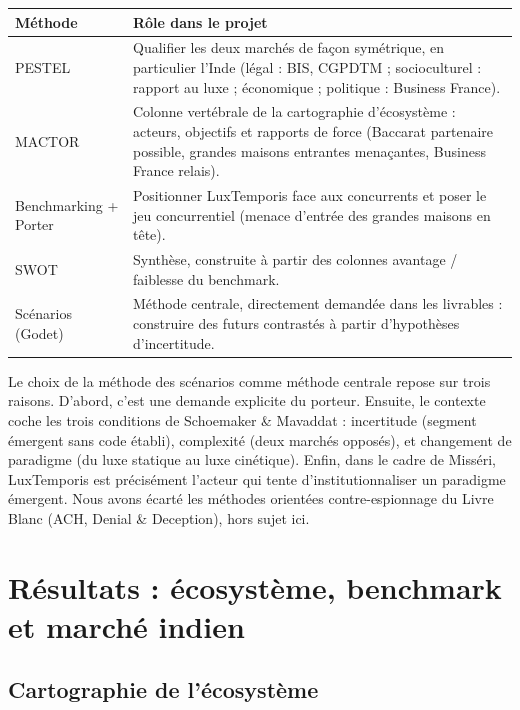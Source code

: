 \documentclass[11pt,a4paper]{article}
\begin{document}
\begin{center}
\begin{tabularx}{\linewidth}{L{3.4cm} X}
\toprule
\textbf{Méthode} & \textbf{Rôle dans le projet} \\
\midrule
PESTEL & Qualifier les deux marchés de façon symétrique, en particulier l'Inde (légal : BIS, CGPDTM ; socioculturel : rapport au luxe ; économique ; politique : Business France). \\
\addlinespace
MACTOR & Colonne vertébrale de la cartographie d'écosystème : acteurs, objectifs et rapports de force (Baccarat partenaire possible, grandes maisons entrantes menaçantes, Business France relais). \\
\addlinespace
Benchmarking + Porter & Positionner LuxTemporis face aux concurrents et poser le jeu concurrentiel (menace d'entrée des grandes maisons en tête). \\
\addlinespace
SWOT & Synthèse, construite à partir des colonnes avantage / faiblesse du benchmark. \\
\addlinespace
Scénarios (Godet) & Méthode centrale, directement demandée dans les livrables : construire des futurs contrastés à partir d'hypothèses d'incertitude. \\

\bottomrule
\end{tabularx}
\end{center}

Le choix de la méthode des scénarios comme méthode centrale repose sur trois raisons. D'abord, c'est une demande explicite du porteur. Ensuite, le contexte coche les trois conditions de Schoemaker \& Mavaddat : incertitude (segment émergent sans code établi), complexité (deux marchés opposés), et changement de paradigme (du luxe statique au luxe cinétique). Enfin, dans le cadre de Misséri, LuxTemporis est précisément l'acteur qui tente d'institutionnaliser un paradigme émergent. Nous avons écarté les méthodes orientées contre-espionnage du Livre Blanc (ACH, Denial \& Deception), hors sujet ici.

\section{Résultats : écosystème, benchmark et marché indien}

\subsection{Cartographie de l'écosystème}
\end{document}
